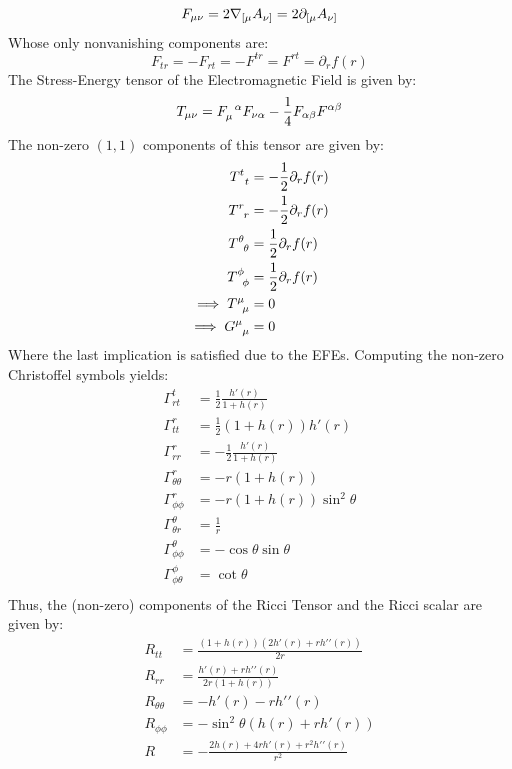 \documentclass{article}
\begin{document}
\begin{equation*}
   F_{\mu\nu} = 2\nabla_{[\mu}A_{\nu]} = 2\partial_{[\mu}A_{\nu]} \\
\end{equation*}
Whose only nonvanishing components are:
\begin{equation*}
   F_{tr} = -F_{rt} = -F^{tr} = F^{rt} = \partial_r f(r)
\end{equation*}
The Stress-Energy tensor of the Electromagnetic Field is given by:
\begin{equation*}
   T_{\mu\nu} = F_{\mu}^{\hspace{5px}\alpha}F_{\nu\alpha} - \frac{1}{4}F_{\alpha\beta}F^{\alpha\beta}
\end{equation*}
The non-zero $(1,1)$ components of this tensor are given by:
\begin{align*}
   T^t_{\hspace{5px}t} &= -\frac{1}{2}\partial_rf(r) \\
   T^r_{\hspace{5px}r} &= -\frac{1}{2}\partial_rf(r) \\
   T^{\theta}_{\hspace{5px}\theta} &= \frac{1}{2}\partial_rf(r) \\
   T^{\phi}_{\hspace{5px}\phi} &= \frac{1}{2}\partial_rf(r) \\
   \implies T^{\mu}_{\hspace{5px}\mu} &= 0 \\
   \implies G^{\mu}_{\hspace{5px}\mu} &= 0 \\
\end{align*}
Where the last implication is satisfied due to the EFEs.
Computing the non-zero Christoffel symbols yields:
\begin{align*}
   \Gamma^{t}_{rt} &= \frac{1}{2}\frac{h'(r)}{1+h(r)} \\
   \Gamma^{r}_{tt} &= \frac{1}{2}(1+h(r))h'(r) \\
   \Gamma^{r}_{rr} &= -\frac{1}{2}\frac{h'(r)}{1+h(r)} \\
   \Gamma^{r}_{\theta\theta} &= -r(1+h(r)) \\
   \Gamma^r_{\phi\phi} &= -r(1+h(r))\sin^2\theta \\
   \Gamma^{\theta}_{\theta r} &= \frac{1}{r} \\
   \Gamma^{\theta}_{\phi\phi} &= -\cos\theta\sin\theta \\
   \Gamma^{\phi}_{\phi\theta} &= \cot\theta \\
\end{align*}
Thus, the (non-zero) components of the Ricci Tensor and the Ricci scalar are given by:
\begin{align*}
   R_{tt} &= \frac{(1+h(r))(2h'(r) + rh' '(r))}{2r} \\
   R_{rr} &= \frac{h'(r) + rh' '(r)}{2r(1+h(r))} \\
   R_{\theta\theta} &= -h'(r) - rh' '(r) \\
   R_{\phi\phi} &= -\sin^2\theta(h(r) + rh'(r)) \\
   R &= -\frac{2h(r) + 4rh'(r) + r^2h' '(r)}{r^2} \\
\end{align*}
\end{document}
